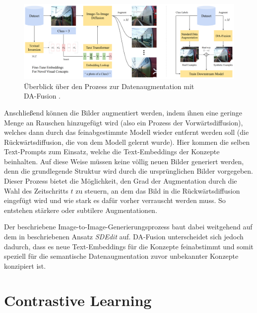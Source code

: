 \begin{figure}[t]
	\centering
	\includegraphics[width=\textwidth]{figure_da-fusion_architecture.png}
	\caption[Überblick über den Prozess zur Datenaugmentation mit DA-Fusion.]{Überblick über den Prozess zur Datenaugmentation mit\\
	DA-Fusion \parencite{Trabucco2023dafusion}.}
	\label{fig:da-fusion-process}
\end{figure}

Anschließend können die Bilder augmentiert werden, indem ihnen eine geringe Menge an Rauschen hinzugefügt wird (also ein Prozess der Vorwärtsdiffusion), welches dann durch das feinabgestimmte Modell wieder entfernt werden soll (die Rückwärtsdiffusion, die von dem Modell gelernt wurde). Hier kommen die selben Text-Prompts zum Einsatz, welche die Text-Embeddings der Konzepte beinhalten. Auf diese Weise müssen keine völlig neuen Bilder generiert werden, denn die grundlegende Struktur wird durch die ursprünglichen Bilder vorgegeben. Dieser Prozess bietet die Möglichkeit, den Grad der Augmentation durch die Wahl des Zeitschritts $t$ zu steuern, an dem das Bild in die Rückwärtsdiffusion eingefügt wird und wie stark es dafür vorher verrauscht werden muss. So entstehen stärkere oder subtilere Augmentationen.

Der beschriebene Image-to-Image-Generierungsprozess baut dabei weitgehend auf dem in \parencite{Meng2022sdedit} beschriebenen Ansatz \emph{SDEdit} auf. DA-Fusion unterscheidet sich jedoch dadurch, dass es neue Text-Embeddings für die Konzepte feinabstimmt und somit speziell für die semantische Datenaugmentation zuvor unbekannter Konzepte konzipiert ist.


\section{Contrastive Learning} \label{sec:contrastive-learning}

